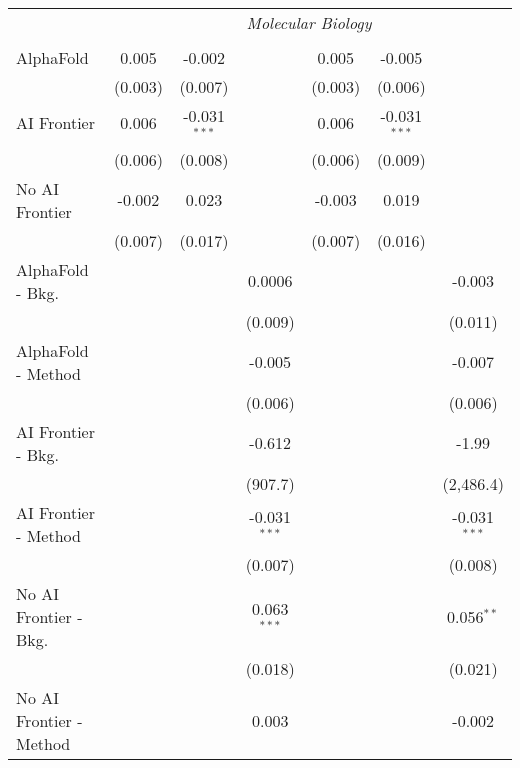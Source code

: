 \begin{tabular}{lcccccc}
 & \multicolumn{6}{c}{\textit{Molecular Biology}} \\ \\
   AlphaFold               & 0.005   & -0.002         &                & 0.005   & -0.005         &   \\   
                           & (0.003) & (0.007)        &                & (0.003) & (0.006)        &   \\   
   AI Frontier             & 0.006   & -0.031$^{***}$ &                & 0.006   & -0.031$^{***}$ &   \\   
                           & (0.006) & (0.008)        &                & (0.006) & (0.009)        &   \\   
   No AI Frontier          & -0.002  & 0.023          &                & -0.003  & 0.019          &   \\   
                           & (0.007) & (0.017)        &                & (0.007) & (0.016)        &   \\   
   AlphaFold - Bkg.        &         &                & 0.0006         &         &                & -0.003\\   
                           &         &                & (0.009)        &         &                & (0.011)\\   
   AlphaFold - Method      &         &                & -0.005         &         &                & -0.007\\   
                           &         &                & (0.006)        &         &                & (0.006)\\   
   AI Frontier - Bkg.      &         &                & -0.612         &         &                & -1.99\\   
                           &         &                & (907.7)        &         &                & (2,486.4)\\   
   AI Frontier - Method    &         &                & -0.031$^{***}$ &         &                & -0.031$^{***}$\\   
                           &         &                & (0.007)        &         &                & (0.008)\\   
   No AI Frontier - Bkg.   &         &                & 0.063$^{***}$  &         &                & 0.056$^{**}$\\   
                           &         &                & (0.018)        &         &                & (0.021)\\   
   No AI Frontier - Method &         &                & 0.003          &         &                & -0.002\\   

\end{tabular}
